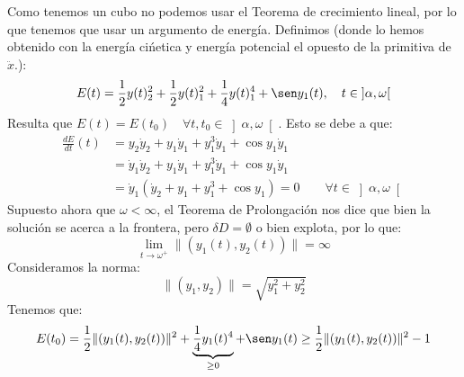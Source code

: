 \documentclass[12pt]{article}
\begin{document}
\begin{ejercicio}
        \noindent
        Como tenemos un cubo no podemos usar el Teorema de crecimiento lineal, por lo que tenemos que usar un argumento de energía. Definimos (donde lo hemos obtenido con la energía cińetica y energía potencial el opuesto de la primitiva de $\ddot{x}$.):
        \begin{equation*}
            E(t) = \frac{1}{2}y(t)_2^2 + \frac{1}{2}y(t)_1^2 + \frac{1}{4}y(t)_1^4+\sen y_1(t), \quad t\in \left]\alpha,\omega\right[
        \end{equation*}
        Resulta que $E(t) = E(t_0)\quad \forall t,t_0 \in \left]\alpha,\omega\right[$. Esto se debe a que:
        \begin{align*}
            \frac{dE}{dt}(t) &= y_2\dot{y}_2 + y_1\dot{y}_1 + y_1^3 \dot{y}_1 + \cos y_1 \dot{y}_1 \\
                             &= \dot{y}_1\dot{y}_2 + y_1\dot{y}_1 + y_1^3 \dot{y}_1 + \cos y_1 \dot{y}_1 \\
                             &= \dot{y}_1(\dot{y}_2 + y_1 + y_1^3 + \cos y_1) = 0 \qquad \forall t\in \left]\alpha,\omega\right[
        \end{align*}
        Supuesto ahora que $\omega < \infty$, el Teorema de Prolongación nos dice que bien la solución se acerca a la frontera, pero $\delta D = \emptyset $ o bien explota, por lo que:
        \begin{equation*}
            \lim_{t\to\omega^+}\|(y_1(t),y_2(t))\| = \infty
        \end{equation*}
        Consideramos la norma:
        \begin{equation*}
            \|(y_1,y_2)\| = \sqrt{y_1^2 + y_2^2}
        \end{equation*}
        Tenemos que:
        \begin{equation*}
            E(t_0) = \frac{1}{2} \|(y_1(t),y_2(t))\|^2 + \underbrace{\frac{1}{4}y_1(t)^4}_{\geq 0} + \sen y_1(t) \geq \frac{1}{2}\|(y_1(t),y_2(t))\|^2 - 1
        \end{equation*}
    \end{ejercicio}
\end{document}
